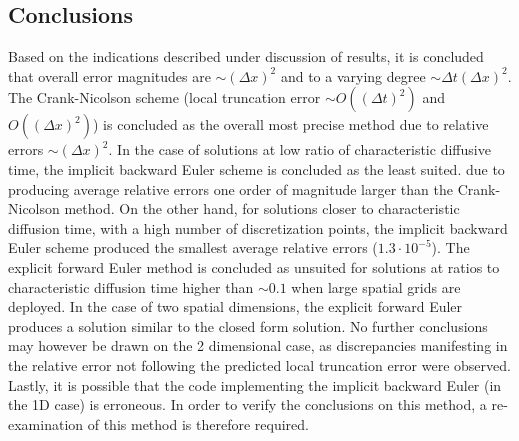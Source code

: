\documentclass[%
oneside,                 %
final,                   %
10pt]{article}
\begin{document}
\subsection{Conclusions}
Based on the indications described under discussion of results, it is concluded that overall error magnitudes are $\sim (\Delta x)^2$ and to a varying degree  $\sim \Delta t (\Delta x)^2$. The Crank-Nicolson scheme (local truncation error $\sim O((\Delta t)^2)$ and $O((\Delta x)^2)$) is concluded as the overall most precise method due to relative errors $\sim (\Delta x)^2$. In the case of solutions at low ratio of characteristic diffusive time, the implicit backward Euler scheme is concluded as the least suited. due to producing average relative errors one order of magnitude larger than the Crank-Nicolson method. On the other hand, for solutions closer to characteristic diffusion time, with a high number of discretization points, the implicit backward Euler scheme produced the smallest average relative errors ($1.3 \cdot 10^{-5}$). The explicit forward Euler method is concluded as unsuited for solutions at ratios to characteristic diffusion time higher than $\sim 0.1$ when large spatial grids are deployed. In the case of two spatial dimensions, the explicit forward Euler produces a solution similar to the closed form solution. No further conclusions may however be drawn on the 2 dimensional case, as discrepancies manifesting in the relative error not following the predicted local truncation error were observed. Lastly, it is possible that the code implementing the implicit backward Euler (in the 1D case) is erroneous. In order to verify the conclusions on this method, a re-examination of this method is therefore required.
\newline






\end{document}
